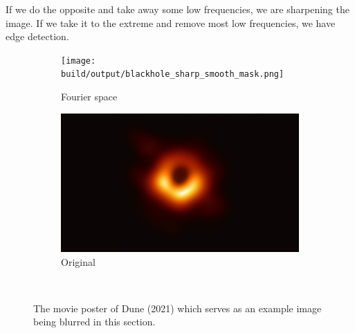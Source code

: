 If we do the opposite and take away some low frequencies, we are sharpening the image.
If we take it to the extreme and remove most low frequencies, we have edge detection.
\begin{figure}[htbp]
    \centering
    \begin{subfigure}[h]{.49\linewidth}
        \centering
        \texttt{[image: build/output/blackhole\_sharp\_smooth\_mask.png]}
        \caption{Fourier space}
    \end{subfigure}
    \begin{subfigure}[h]{.49\linewidth}
        \centering
        \includegraphics[width=.9\linewidth]{images/blackhole.png}
        \caption{Original}
    \end{subfigure}\
    \caption{The movie poster of Dune (2021) which serves as an example image being blurred in this section.}
    \label{fig:dune_orig}
\end{figure}